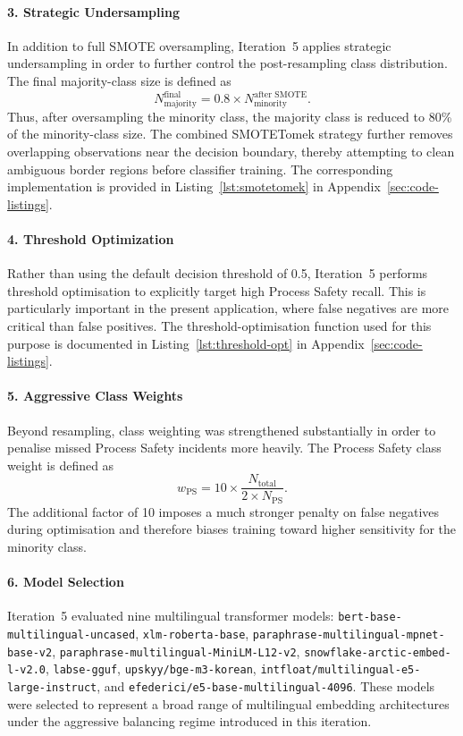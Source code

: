\documentclass[11pt, titlepage, bibliography=totoc]{scrreprt}
\begin{document}
\paragraph{3. Strategic Undersampling}
In addition to full SMOTE oversampling, Iteration~5 applies strategic undersampling in order to further control the post-resampling class distribution. The final majority-class size is defined as
\begin{equation}
N_{\text{majority}}^{\text{final}} = 0.8 \times N_{\text{minority}}^{\text{after SMOTE}}.
\end{equation}
Thus, after oversampling the minority class, the majority class is reduced to 80\% of the minority-class size. The combined SMOTETomek strategy further removes overlapping observations near the decision boundary, thereby attempting to clean ambiguous border regions before classifier training. The corresponding implementation is provided in Listing~\ref{lst:smotetomek} in Appendix~\ref{sec:code-listings}.

\paragraph{4. Threshold Optimization}
Rather than using the default decision threshold of 0.5, Iteration~5 performs threshold optimisation to explicitly target high Process Safety recall. This is particularly important in the present application, where false negatives are more critical than false positives. The threshold-optimisation function used for this purpose is documented in Listing~\ref{lst:threshold-opt} in Appendix~\ref{sec:code-listings}.

\paragraph{5. Aggressive Class Weights}
Beyond resampling, class weighting was strengthened substantially in order to penalise missed Process Safety incidents more heavily. The Process Safety class weight is defined as
\begin{equation}
w_{\text{PS}} = 10 \times \frac{N_{\text{total}}}{2 \times N_{\text{PS}}}.
\end{equation}
The additional factor of 10 imposes a much stronger penalty on false negatives during optimisation and therefore biases training toward higher sensitivity for the minority class.

\paragraph{6. Model Selection}
Iteration~5 evaluated nine multilingual transformer models: \texttt{bert-base-multilingual-uncased}, \texttt{xlm-roberta-base}, \texttt{paraphrase-multilingual-mpnet-base-v2}, \texttt{paraphrase-multilingual-MiniLM-L12-v2}, \texttt{snowflake-arctic-embed-l-v2.0}, \texttt{labse-gguf}, \texttt{upskyy/bge-m3-korean}, \texttt{intfloat/multilingual-e5-large-instruct}, and \texttt{efederici/e5-base-multilingual-4096}. These models were selected to represent a broad range of multilingual embedding architectures under the aggressive balancing regime introduced in this iteration.
\end{document}
